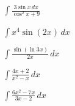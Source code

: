 \documentclass[12pt]{exam}
\begin{document}
\begin{questions}
\question $\displaystyle \int \frac{3\sin x \, dx}{\cos^2 x + 9}$
\vspace{.35in}

\question $\displaystyle \int  x^4 \sin(2x) \, dx$
\vspace{.35in}

\question $\displaystyle \int   \frac{\sin(\ln 3x)}{2x} \, dx$
\vspace{.35in}

\question $\displaystyle \int   \frac{4x+2}{x^2-x} \, dx$
\vspace{.35in}

\question $\displaystyle \int   \frac{6x^2-7x}{3x-2} \, dx$
\vspace{.35in}



\end{questions}
\end{document}
